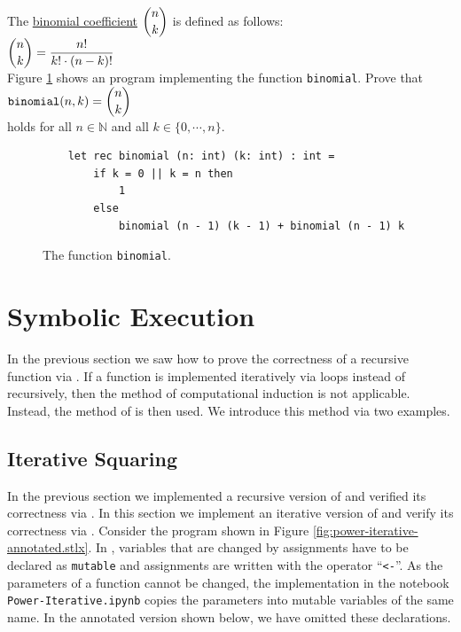 \exerciseEng
The \href{https://en.wikipedia.org/wiki/Binomial_coefficient}{binomial coefficient} $\displaystyle {n \choose k}$ is defined as follows:
\\[0.2cm]
\hspace*{1.3cm}
$\displaystyle {n \choose k} = \frac{n!}{k! \cdot (n-k)!}$
\\[0.2cm]
Figure \ref{fig:binomial} shows an \Fsharp{} program implementing the function \texttt{binomial}.  Prove
that 
\\[0.2cm]
\hspace*{1.3cm}
$\displaystyle \mathtt{binomial}(n, k) = {n \choose k}$
\\[0.2cm]
holds for all $n \in \mathbb{N}$ and all $k \in \{ 0, \cdots, n \}$. \eox

\begin{figure}[!ht]
\centering
\begin{verbatim}
    let rec binomial (n: int) (k: int) : int =
        if k = 0 || k = n then
            1
        else
            binomial (n - 1) (k - 1) + binomial (n - 1) k
\end{verbatim}
\vspace*{-0.3cm}
\caption{The function \texttt{binomial}.}
\label{fig:binomial}
\end{figure}



\section{Symbolic Execution}
In the previous section we saw how to prove the correctness of a recursive function via
.  If a function is implemented iteratively via loops instead of recursively,
then the method of computational induction is not applicable.   Instead, the method of 
  is then used.
We introduce this method via two examples.

\subsection{Iterative Squaring}
In the previous section we implemented a recursive version of  and verified its
correctness via .  In this section we implement an iterative version of
 and verify its correctness via .
Consider the program shown in Figure \ref{fig:power-iterative-annotated.stlx}.  In \Fsharp, variables that
are changed by assignments have to be declared as \texttt{mutable} and assignments are written with the operator
``\texttt{<-}''.  As the parameters of a function cannot be changed, the implementation in the notebook
\texttt{Power-Iterative.ipynb} copies the parameters into mutable variables of the same name.  In the annotated
version shown below, we have omitted these declarations. 

